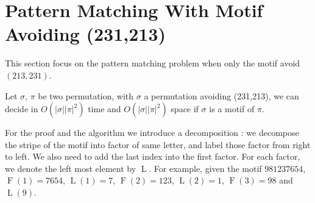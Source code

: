 \documentclass[a4paper]{llncs}
\newcommand{\ptext}{\pi}
\newcommand{\pmotif}{\sigma}
\DeclareMathOperator{\firsta}{L}
\newcommand{\first}[1]{\firsta({#1})}
\DeclareMathOperator{\factora}{F}
\newcommand{\factor}[1]{\factora({#1})}
\begin{document}

\section{Pattern Matching With Motif Avoiding (231,213)}	
\label{section:sigma only avoid 231 and 213}

This section focus on the pattern matching problem when only the motif avoid $(213,231)$.

\begin{proposition}
Let $\pmotif$, $\ptext$ 
be two permutation,
with  $\pmotif$ a permutation avoiding (231,213), 
we can decide in $O(|\pmotif||\ptext|^2)$ time
and $O(|\pmotif||\ptext|^2)$ space
if $\pmotif$ 
is a motif of $\ptext$.
\end{proposition}

			

			
For the proof and the algorithm we introduce a decomposition : we decompose the stripe of the motif into factor of same letter, and label those factor from right to left. We also need to add the last index into the first factor. For each factor, we denote the left most element by $\firsta$. For example, given the motif $981237654$, $\factor{1} =7654$, $\first{1}=7$, $\factor{2}=123$, $\first{2}=1$, $\factor{3}=98$ and $\first{9}$. \\
			
\end{document}
